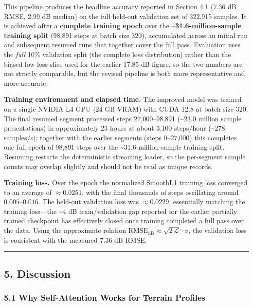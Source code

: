 \documentclass[
]{article}
\begin{document}
This pipeline produces the headline accuracy reported in Section 4.1
(7.36 dB RMSE, 2.99 dB median) on the full held-out validation set of
322,915 samples. It is achieved after a \textbf{complete training epoch}
over the \textbf{\textasciitilde31.6-million-sample training split}
(98,891 steps at batch size 320), accumulated across an initial run and
subsequent resumed runs that together cover the full pass. Evaluation
uses the \emph{full} 10\% validation split (the complete loss
distribution) rather than the biased low-loss slice used for the earlier
17.85 dB figure, so the two numbers are not strictly comparable, but the
revised pipeline is both more representative and more accurate.

\textbf{Training environment and elapsed time.} The improved model was
trained on a single NVIDIA L4 GPU (24 GB VRAM) with CUDA 12.8 at batch
size 320. The final resumed segment processed steps 27,000--98,891
(\textasciitilde23.0 million sample presentations) in approximately 23
hours at about 3,100 steps/hour (\textasciitilde278 samples/s); together
with the earlier segments (steps 0--27,000) this completes one full
epoch of 98,891 steps over the \textasciitilde31.6-million-sample
training split. Resuming restarts the deterministic streaming loader, so
the per-segment sample counts may overlap slightly and should not be
read as unique records.

\textbf{Training loss.} Over the epoch the normalized SmoothL1 training
loss converged to an average of \(\approx 0.0251\), with the final
thousands of steps oscillating around \(0.005\)--\(0.016\). The held-out
validation loss was \(\approx 0.0229\), essentially matching the
training loss---the \textasciitilde4 dB train/validation gap reported
for the earlier partially trained checkpoint has effectively closed once
training completed a full pass over the data. Using the approximate
relation
\(\text{RMSE}_\text{dB} \approx \sqrt{2\,\mathcal{L}}\cdot\sigma\), the
validation loss is consistent with the measured 7.36 dB RMSE.

\begin{center}\rule{0.5\linewidth}{0.5pt}\end{center}

\subsection{5. Discussion}\label{discussion}

\subsubsection{5.1 Why Self-Attention Works for Terrain
Profiles}\label{why-self-attention-works-for-terrain-profiles}
\end{document}

